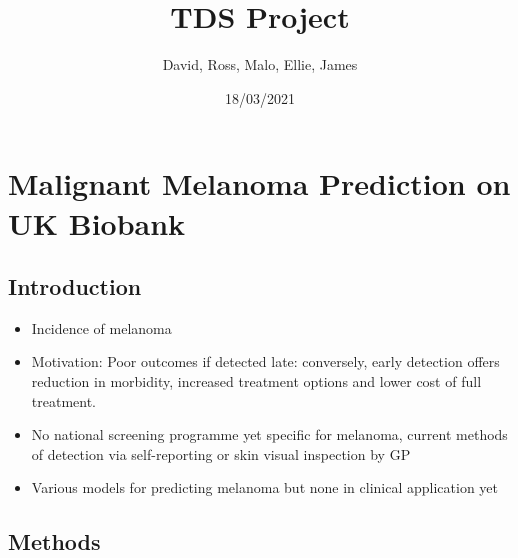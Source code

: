 \documentclass[
]{article}
\title{TDS Project}
\author{David, Ross, Malo, Ellie, James}
\date{18/03/2021}
\providecommand{\tightlist}{%
  \setlength{\itemsep}{0pt}\setlength{\parskip}{0pt}}
\begin{document}
\maketitle

\hypertarget{malignant-melanoma-prediction-on-uk-biobank}{%
\section{Malignant Melanoma Prediction on UK
Biobank}\label{malignant-melanoma-prediction-on-uk-biobank}}

\hypertarget{introduction}{%
\subsection{Introduction}\label{introduction}}

\begin{itemize}
\tightlist
\item
  Incidence of melanoma
\item
  Motivation: Poor outcomes if detected late: conversely, early
  detection offers reduction in morbidity, increased treatment options
  and lower cost of full treatment.\\
\item
  No national screening programme yet specific for melanoma, current
  methods of detection via self-reporting or skin visual inspection by
  GP\\
\item
  Various models for predicting melanoma but none in clinical
  application yet
\end{itemize}

\hypertarget{methods}{%
\subsection{Methods}\label{methods}}
\end{document}
